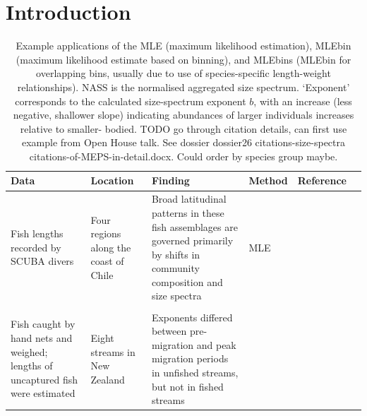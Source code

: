 \documentclass[12pt]{article}
\renewcommand{\baselinestretch}{1.6}  %
\begin{document}

\section*{Introduction}


\thispagestyle{empty}

\begin{landscape}
  



\renewcommand{\baselinestretch}{1}
\begin{table}
  \caption{Example applications of the MLE (maximum likelihood estimation),
    MLEbin (maximum likelihood estimate based on binning),
    and MLEbins (MLEbin for overlapping bins, usually due to use of species-specific
    length-weight relationships). NASS is the normalised aggregated size
    spectrum. `Exponent' corresponds to the calculated size-spectrum
    exponent $b$, with an increase (less negative, shallower slope) indicating abundances of larger individuals
    increases relative to smaller- bodied. 
    TODO go through citation details, can first
    use example from Open House talk. See dossier dossier26
    citations-size-spectra citations-of-MEPS-in-detail.docx. Could order by
    species group maybe.
    \label{tab:examples}}
  \centering
  \begin{tabular}{
      >{\raggedright\arraybackslash}p{6cm}
      >{\raggedright\arraybackslash}p{3cm}
      >{\raggedright\arraybackslash}p{7cm}
      >{\raggedright\arraybackslash}p{2cm}
      >{\raggedright\arraybackslash}p{2cm}
      >{\raggedright\arraybackslash}p{2cm}}
\hline
Data &  Location & Finding & Method & Reference \\ %
\hline
Fish lengths recorded by SCUBA divers & Four regions along the coast of Chile &
Broad latitudinal patterns in these fish assemblages are governed primarily
by shifts in community composition and size spectra &
MLE &
\cite{gart26} \\
& & & & \\
Fish caught by hand nets and weighed; lengths of uncaptured fish were estimated 
 & Eight streams in New Zealand 
 & Exponents differed between pre-migration and peak migration periods in
   unfished streams, but not in fished streams &

\end{tabular}
\end{table}
\end{landscape}
\end{document}

